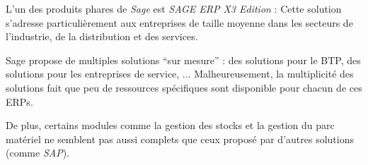         L'un des produits phares de \textit{Sage} est \textit{SAGE ERP X3 Edition} : Cette solution s'adresse particulièrement aux entreprises de taille moyenne dans les secteurs de l'industrie, de la distribution et des services.

        Sage propose de multiples solutions ``sur mesure'' : des solutions pour le BTP, des solutions pour les entreprises de service, ... Malheureusement, la multiplicité des solutions fait que peu de ressources spécifiques sont disponible pour chacun de ces ERPs.

        De plus, certains modules comme la gestion des stocks et la gestion du parc matériel ne semblent pas aussi complets que ceux proposé par d'autres solutions (comme \textit{SAP}).
